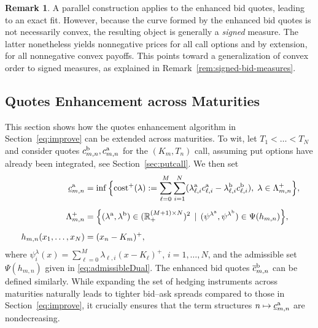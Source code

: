 \documentclass[11pt]{article}
\newcommand{\R}{\mathbb{R}} %
\theoremstyle{plain}
\theoremstyle{definition}
\newtheorem{remark}[theorem]{Remark}
\theoremstyle{remark}
\theoremstyle{plain}
\begin{document}
\begin{remark}\label{rem:bid}
A parallel construction applies to the enhanced bid quotes, leading to an exact fit. However, because the curve formed by  the enhanced bid quotes is not necessarily convex, the resulting object is generally a \emph{signed} measure. The latter nonetheless yields nonnegative prices for all call options and by extension, for all nonnegative convex payoffs. This points toward a generalization of convex order to signed measures, as explained in Remark~\ref{rem:signed-bid-measures}. %


\end{remark} 






\subsection{Quotes Enhancement across Maturities}\label{app:quoteAcrossMaturities}

This section shows how the quotes enhancement algorithm in Section~\ref{eq:improve} can be extended across maturities. To wit, let $T_1<\ldots < T_N$ and consider  quotes $c^{\rm b}_{m,n}, c^{\rm a}_{m,n}$ for the $(K_m,T_n)$ call, assuming put options have already been integrated, see Section~\ref{sec:putcall}.  We then set
\begin{align}
 \underline{c}^{\rm a}_{m,n} &= \inf \Big\{ \text{cost}^{+}(\lambda) := \sum_{\ell = 0}^M \sum_{i=1}^N  (\lambda^{\rm a}_{\ell,i} c^{\rm a}_{\ell,i}  - \lambda^{\rm b}_{\ell,i} c^{\rm b}_{\ell,i}), \; \lambda \in \Lambda_{m,n}^{+} \Big\}, \label{eq:enhancedAskAcrossMat}\\[0.5em]
  \Lambda_{m,n}^{+} &= \Big\{(\lambda^{\rm a},\lambda^{\rm b})\in (\R_+^{(M+1) \times N})^2 \, \mid \, (\psi^{\lambda^{\rm a}},\psi^{\lambda^{\rm b}}) \in \Psi(h_{m,n}) \Big\}, \nonumber \\[0.5em] \; 
  h_{m,n}(x_1,\ldots, x_N) &= (x_n - K_m)^+, \nonumber
\end{align}
where %
$\psi_{i}^{\lambda}(x) = \sum_{\ell =0}^M \lambda_{\ell,i} (x- K_{\ell})^+$, $i = 1,\ldots, N$, and the admissible set $\Psi(h_{m,n})$ given in \eqref{eq:admissibleDual}. The enhanced bid quotes  $ \overline{c}^{\rm b}_{m,n}$ can be defined similarly. While expanding the set of hedging instruments across maturities naturally 
leads to  tighter bid--ask spreads compared to those in Section~\ref{eq:improve},  
it crucially ensures that the term structures $n \mapsto \underline{c}^{\rm a}_{m,n}$ are nondecreasing.  %
\end{document}

